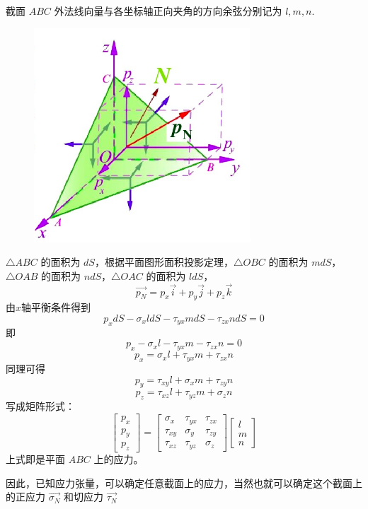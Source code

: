 \documentclass[12pt,a4paper]{article}
\begin{document}
截面 $ABC$ 外法线向量与各坐标轴正向夹角的方向余弦分别记为 $l,m,n$.

\begin{figure}[H]
\centering
\includegraphics[scale=0.5]{./figures/8.png}
\caption{}
\end{figure}

$\triangle ABC$ 的面积为 $dS$，根据平面图形面积投影定理，$\triangle OBC$ 的面积为 $mdS$，$\triangle OAB$ 的面积为 $ndS$，$\triangle OAC$ 的面积为 $ldS$，
$$
\overrightarrow{p_N}=p_x \overrightarrow{i} +p_y \overrightarrow{j} +p_z \overrightarrow{k}
$$
由$x$轴平衡条件得到
$$
p_x dS-\sigma_x l dS-\tau_{yx}mdS-\tau_{zx}ndS=0
$$
即
$$
p_x -\sigma_x l -\tau_{yx}m-\tau_{zx}n=0
$$
$$
p_x =\sigma_x l +\tau_{yx}m+\tau_{zx}n
$$
同理可得
$$
p_y =\tau_{xy} l +\sigma_x m +\tau_{zy}n
$$
$$
p_z =\tau_{xz} l +\tau_{yz}m + \sigma_z n
$$
写成矩阵形式：
$$
\begin{bmatrix}
p_x \\
p_y \\
p_z
\end{bmatrix}=
\begin{bmatrix}
\sigma _x & \tau_{yx} & \tau_{zx} \\
\tau_{xy} & \sigma _y & \tau_{zy} \\
\tau_{xz} & \tau_{yz} & \sigma _z
\end{bmatrix}
\begin{bmatrix}
l \\
m \\
n
\end{bmatrix}
$$
上式即是平面 $ABC$ 上的应力。

因此，已知应力张量，可以确定任意截面上的应力，当然也就可以确定这个截面上的正应力 $\overrightarrow{\sigma _N}$ 和切应力 $\overrightarrow{\tau_N}$
\end{document}

